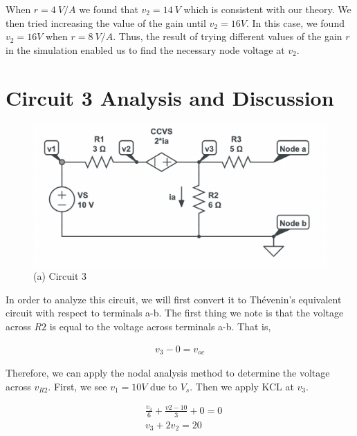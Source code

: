 \documentclass[12pt]{article}
\begin{document}
When $r = \SI{4}{V/A}$ we found that $v_2 = \SI{14}{V}$ which is consistent with our theory. We then tried increasing the value of the gain until $v_2 = 16V$. In this case, we found $v_2 = 16V$ when $r = \SI{8}{V/A}$. Thus, the result of trying different values of the gain $r$ in the simulation enabled us to find the necessary node voltage at $v_2$.

\section{Circuit 3 Analysis and Discussion}

\begin{figure}[H]
    \begin{center}
        \includegraphics[scale=0.6]{circuit-3.png}
        \caption { (a) Circuit 3}
    \end{center}
\end{figure}

In order to analyze this circuit, we will first convert it to Thévenin's equivalent circuit with respect to terminals a-b. The first thing we note is that the voltage across $R2$ is equal to the voltage across terminals a-b. That is,

\begin{equation*}
    \begin{split}
        v_3 - 0 = v_{oc} 
    \end{split}
\end{equation*}

Therefore, we can apply the nodal analysis method to determine the voltage across $v_{R2}$. First, we see $v_1 = 10V$ due to $V_s$. Then we apply KCL at $v_3$.

\begin{equation}
    \begin{split}
        &\frac{v_3}{6} + \frac{v2-10}{3} + 0 = 0 \\
        &v_3 + 2v_2 = 20
    \end{split}
\end{equation}
\end{document}
